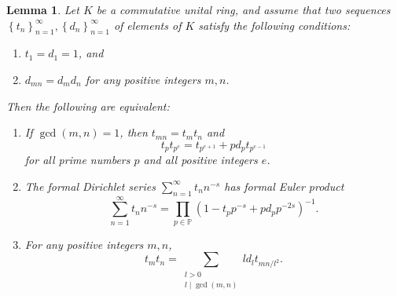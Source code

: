 \documentclass[10pt,leqno,twoside]{article}
\theoremstyle{plain}
\newtheorem{lemma}[lem]{Lemma}
\theoremstyle{definition}
\numberwithin{equation}{section}
\numberwithin{lem}{section}
\newcommand{\cbr}[1]{\left\{#1\right\}}
\begin{document}
\begin{lemma}\label{lem: miyake lem 4.5.12}
    Let $K$ be a commutative unital ring, and assume that two sequences $\cbr{t_n}_{n=1}^\infty,\cbr{d_n}_{n=1}^\infty$ of elements of $K$ satisfy the following conditions:
    \begin{enumerate}[label=\textup{(\roman*)}]
        \item $t_1 =d_1 = 1$, and 
        \item $d_{mn} = d_md_n$ for any positive integers $m,n$.
    \end{enumerate} Then the following are equivalent:
    \begin{enumerate}[label=\textup{(\arabic*)}]
        \item If $\gcd(m,n) = 1$, then $t_{mn} = t_mt_n$ and \[t_pt_{p^e} = t_{p^{e+1}} + pd_pt_{p^{e-1}}\] for all prime numbers $p$ and all positive integers $e$.
        \item The formal Dirichlet series $\sum_{n=1}^\infty t_nn^{-s}$ has formal Euler product \[\sum_{n=1}^\infty t_nn^{-s} = \prod_{p\in\mathbb P}(1-t_pp^{-s} + pd_pp^{-2s})^{-1}.\]
        \item For any positive integers $m,n$, \[t_mt_n = \sum_{\substack{l>0\\l\mid \gcd(m,n)}}ld_lt_{mn/l^2}.\]
    \end{enumerate}
\end{lemma}
\end{document}
